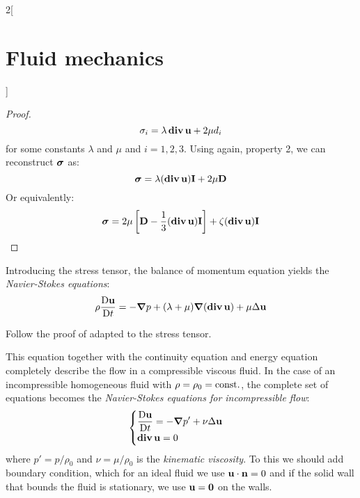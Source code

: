\documentclass[../../../main_physics.tex]{subfiles}
\begin{document}
\begin{multicols}{2}[\section{Fluid mechanics}]
\begin{proof}
    $$
      \sigma_i=\lambda \operatorname{\boldsymbol{\mathrm{div}}} \boldsymbol{\mathrm{u}} + 2\mu d_i
    $$
    for some constants $\lambda$ and $\mu$ and $i=1,2,3$. Using again, property 2, we can reconstruct $\boldsymbol{\mathrm{\sigma}}$ as:
    $$
      \boldsymbol{\mathrm{\sigma}}=\lambda (\operatorname{\boldsymbol{\mathrm{div}}} \boldsymbol{\mathrm{u}}) \boldsymbol{\mathrm{I}} + 2\mu \boldsymbol{\mathrm{D}}
    $$
    Or equivalently:
    $$
      \boldsymbol{\mathrm{\sigma}}=2\mu\left[\boldsymbol{\mathrm{D}} -\frac{1}{3}(\operatorname{\boldsymbol{\mathrm{div}}}\boldsymbol{\mathrm{u}}) \boldsymbol{\mathrm{I}}\right]+\zeta(\operatorname{\boldsymbol{\mathrm{div}}}\boldsymbol{\mathrm{u}}) \boldsymbol{\mathrm{I}}
    $$
  \end{proof}
  \begin{corollary}
    Introducing the stress tensor, the balance of momentum equation yields the \emph{Navier-Stokes equations}:
    $$
      \rho \frac{\mathrm{D}\boldsymbol{\mathrm{u}}}{\mathrm{D}t}=-\grad p + (\lambda+\mu)\grad(\operatorname{\boldsymbol{\mathrm{div}}}\boldsymbol{\mathrm{u}}) + \mu\Delta\boldsymbol{\mathrm{u}}
    $$
  \end{corollary}
  \begin{sproof}
    Follow the proof of  adapted to the stress tensor.
  \end{sproof}
  \begin{remark}
    This equation together with the continuity equation and energy equation completely describe the flow in a compressible viscous fluid. In the case of an incompressible homogeneous fluid with $\rho=\rho_0=\text{const.}$,  the
    complete set of equations becomes the \emph{Navier-Stokes equations for incompressible flow}:
    $$
      \begin{cases}
        \displaystyle\frac{\mathrm{D}\boldsymbol{\mathrm{u}}}{\mathrm{D}t}=-\grad p' + \nu\Delta\boldsymbol{\mathrm{u}} \\
        \displaystyle\operatorname{\boldsymbol{\mathrm{div}}}\boldsymbol{\mathrm{u}}=0
      \end{cases}
    $$
    where $p'=p/\rho_0$ and $\nu=\mu/\rho_0$ is the \emph{kinematic viscosity}. To this we should add boundary condition, which for an ideal fluid we use $\boldsymbol{\mathrm{u}}\cdot \boldsymbol{\mathrm{n}}=0$ and if the solid wall that bounds the fluid is stationary, we use $\boldsymbol{\mathrm{u}}=\boldsymbol{\mathrm{0}}$ on the walls.
  \end{remark}

\end{multicols}
\end{document}
